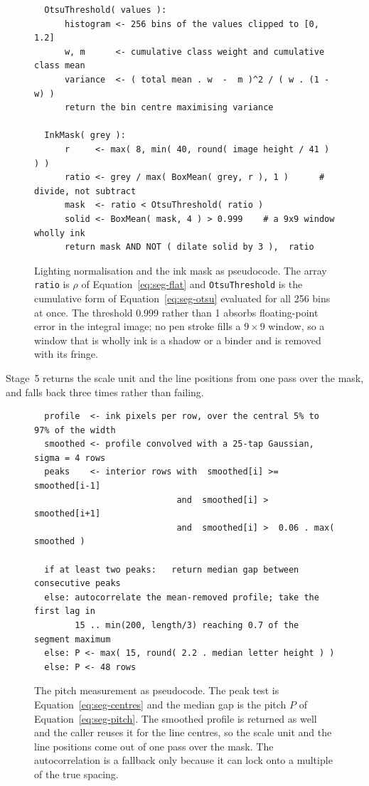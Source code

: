 \begin{figure}[h]
\centering
\fontsize{8.5}{10.2}\selectfont
\begin{verbatim}
  OtsuThreshold( values ):
      histogram <- 256 bins of the values clipped to [0, 1.2]
      w, m      <- cumulative class weight and cumulative class mean
      variance  <- ( total mean . w  -  m )^2 / ( w . (1 - w) )
      return the bin centre maximising variance

  InkMask( grey ):
      r     <- max( 8, min( 40, round( image height / 41 ) ) )
      ratio <- grey / max( BoxMean( grey, r ), 1 )      # divide, not subtract
      mask  <- ratio < OtsuThreshold( ratio )
      solid <- BoxMean( mask, 4 ) > 0.999    # a 9x9 window wholly ink
      return mask AND NOT ( dilate solid by 3 ),  ratio
\end{verbatim}
\caption{Lighting normalisation and the ink mask as pseudocode. The array \texttt{ratio} is $\rho$ of Equation~\ref{eq:seg-flat} and \texttt{OtsuThreshold} is the cumulative form of Equation~\ref{eq:seg-otsu} evaluated for all 256 bins at once. The threshold 0.999 rather than 1 absorbs floating-point error in the integral image; no pen stroke fills a $9\times9$ window, so a window that is wholly ink is a shadow or a binder and is removed with its fringe.}
\label{fig:seg-inkpseudo}
\end{figure}

Stage~5 returns the scale unit and the line positions from one pass over the mask, and falls back three times rather than failing.

\begin{figure}[h]
\centering
\fontsize{8.5}{10.2}\selectfont
\begin{verbatim}
  profile  <- ink pixels per row, over the central 5% to 97% of the width
  smoothed <- profile convolved with a 25-tap Gaussian, sigma = 4 rows
  peaks    <- interior rows with  smoothed[i] >= smoothed[i-1]
                            and  smoothed[i] >  smoothed[i+1]
                            and  smoothed[i] >  0.06 . max( smoothed )

  if at least two peaks:   return median gap between consecutive peaks
  else: autocorrelate the mean-removed profile; take the first lag in
        15 .. min(200, length/3) reaching 0.7 of the segment maximum
  else: P <- max( 15, round( 2.2 . median letter height ) )
  else: P <- 48 rows
\end{verbatim}
\caption{The pitch measurement as pseudocode. The peak test is Equation~\ref{eq:seg-centres} and the median gap is the pitch $P$ of Equation~\ref{eq:seg-pitch}. The smoothed profile is returned as well and the caller reuses it for the line centres, so the scale unit and the line positions come out of one pass over the mask. The autocorrelation is a fallback only because it can lock onto a multiple of the true spacing.}
\label{fig:seg-pitchpseudo}
\end{figure}

